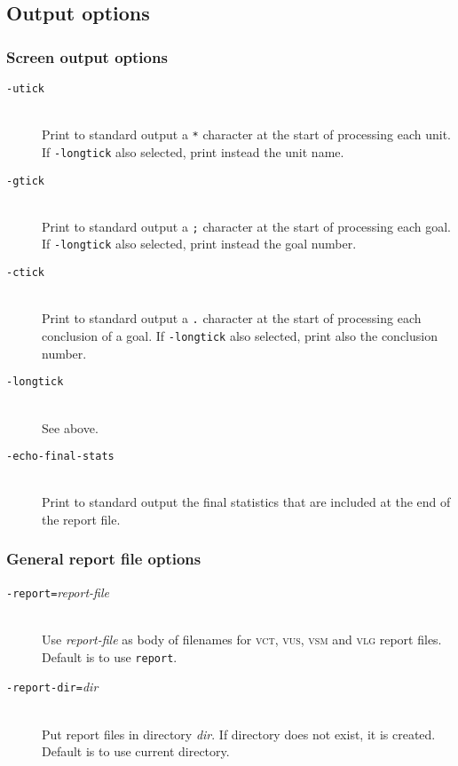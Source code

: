 \documentclass[12pt,fleqn]{article}
\newcommand{\logfile}{\textsc{vlg}}
\newcommand{\goalreportfile}{\textsc{vct}}
\newcommand{\unitsumfile}{\textsc{vus}}
\newcommand{\sessionsumfile}{\textsc{vsm}}
\newcommand{\optionb}[1]{\item[\texttt{-{#1}}]\ \\}
\newcommand{\optionv}[2]{\item[\texttt{-{#1}=}\mdseries\textit{#2}]\ \\}
\begin{document}
\subsection{Output options}


\subsubsection{Screen output options}

\begin{description}
\optionb{utick} Print to standard output a \texttt{*} character at the 
  start of processing each unit.
  If \texttt{-longtick} also selected, print instead 
  the unit name.
\optionb{gtick} Print to standard output a \texttt{;} character at the 
  start of processing each goal.  
  If \texttt{-longtick} also selected, print instead 
  the goal number.
\optionb{ctick} Print to standard output a \texttt{.} character at the 
  start of processing each conclusion of a goal.
  If \texttt{-longtick} also selected, print also
  the conclusion number.
\optionb{longtick} See above.

\optionb{echo-final-stats}
  Print to standard output the final statistics that are included at the
  end of the report file.
\end{description}


\subsubsection{General report file options}

\begin{description}
\optionv{report}{report-file}

  Use \textit{report-file} as body of filenames for \goalreportfile{},
  \unitsumfile{}, \sessionsumfile{} and \logfile{} report files.  Default
  is to use \texttt{report}.

\optionv{report-dir}{dir}
   Put report files in directory \textit{dir}.  If directory does not exist,
   it is created.  Default is to use current directory.
\end{description}
\end{document}
